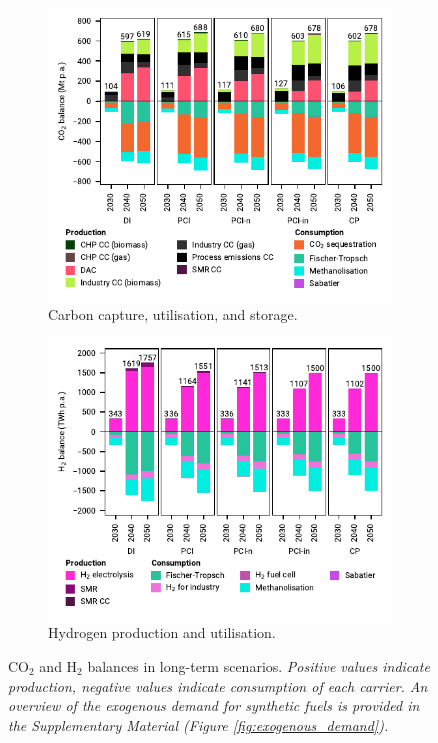 \documentclass[pdflatex,sn-nature]{sn-jnl}
\theoremstyle{thmstyleone}%
\theoremstyle{thmstyletwo}%
\theoremstyle{thmstylethree}%
\begin{document}
\begin{figure}[htbp]
  \centering
  \begin{subfigure}[t]{0.49\textwidth}
      \vspace{0pt}
      \includegraphics[width=1\textwidth]{figures/balances_overview_co2_stored}
      \caption{Carbon capture, utilisation, and storage.}
      \label{fig:balances_overview_co2_stored}
  \end{subfigure}
  \begin{subfigure}[t]{0.49\textwidth}
      \vspace{0pt}
      \includegraphics[width=1\textwidth]{figures/balances_overview_H2}
      \caption{Hydrogen production and utilisation.}
      \label{fig:PCI_lt_2040_h2}
  \end{subfigure}
  \caption{CO$_2$ and H$_2$ balances in long-term scenarios. \textit{Positive values indicate production, negative values indicate consumption of each carrier. An overview of the exogenous demand for synthetic fuels is provided in the Supplementary Material (Figure \ref{fig:exogenous_demand}).}}
  \label{fig:balances_overview_H2}
\end{figure}
\end{document}
